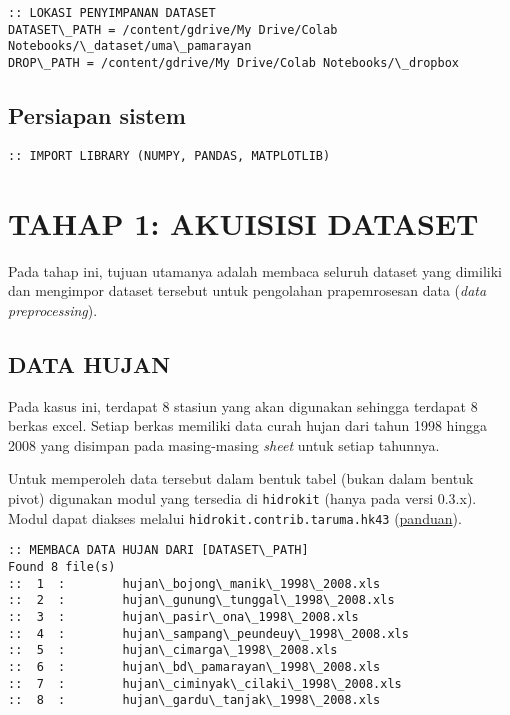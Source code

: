 \documentclass[11pt]{article}
\let\oldsection\section
\renewcommand\section{\clearpage\oldsection}
\begin{document}
    \begin{Verbatim}[commandchars=\\\{\}]
:: LOKASI PENYIMPANAN DATASET
DATASET\_PATH = /content/gdrive/My Drive/Colab Notebooks/\_dataset/uma\_pamarayan
DROP\_PATH = /content/gdrive/My Drive/Colab Notebooks/\_dropbox
    \end{Verbatim}

    \hypertarget{persiapan-sistem}{%
\subsection{Persiapan sistem}\label{persiapan-sistem}}

    \begin{Verbatim}[commandchars=\\\{\}]
:: IMPORT LIBRARY (NUMPY, PANDAS, MATPLOTLIB)
    \end{Verbatim}

    \hypertarget{tahap-1-akuisisi-dataset}{%
\section{TAHAP 1: AKUISISI DATASET}\label{tahap-1-akuisisi-dataset}}

Pada tahap ini, tujuan utamanya adalah membaca seluruh dataset yang
dimiliki dan mengimpor dataset tersebut untuk pengolahan prapemrosesan
data (\emph{data preprocessing}).

    \hypertarget{data-hujan}{%
\subsection{DATA HUJAN}\label{data-hujan}}

Pada kasus ini, terdapat 8 stasiun yang akan digunakan sehingga terdapat
8 berkas excel. Setiap berkas memiliki data curah hujan dari tahun 1998
hingga 2008 yang disimpan pada masing-masing \emph{sheet} untuk setiap
tahunnya.

Untuk memperoleh data tersebut dalam bentuk tabel (bukan dalam bentuk
pivot) digunakan modul yang tersedia di \texttt{hidrokit} (hanya pada
versi 0.3.x). Modul dapat diakses melalui
\texttt{hidrokit.contrib.taruma.hk43}
(\href{https://nbviewer.jupyter.org/gist/taruma/a9dd4ea61db2526853b99600909e9c50}{panduan}).

    \begin{Verbatim}[commandchars=\\\{\}]
:: MEMBACA DATA HUJAN DARI [DATASET\_PATH]
Found 8 file(s)
::  1  :        hujan\_bojong\_manik\_1998\_2008.xls
::  2  :        hujan\_gunung\_tunggal\_1998\_2008.xls
::  3  :        hujan\_pasir\_ona\_1998\_2008.xls
::  4  :        hujan\_sampang\_peundeuy\_1998\_2008.xls
::  5  :        hujan\_cimarga\_1998\_2008.xls
::  6  :        hujan\_bd\_pamarayan\_1998\_2008.xls
::  7  :        hujan\_ciminyak\_cilaki\_1998\_2008.xls
::  8  :        hujan\_gardu\_tanjak\_1998\_2008.xls
    \end{Verbatim}
\end{document}

